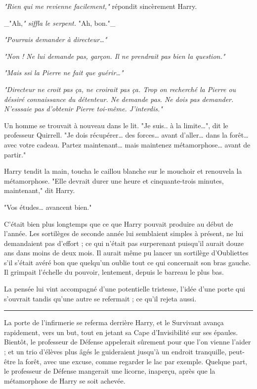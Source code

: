 \emph{"Rien qui me revienne facilement,"}  répondit sincèrement Harry.

\_"Ah,\emph{" siffla le serpent. } "Ah, bon."\_

\emph{"Pourrais demander à directeur…"} 

\emph{"Non ! Ne lui demande pas, garçon. Il ne prendrait pas bien la question."} 

\emph{"Mais ssi la Pierre ne fait que guérir…"} 

\emph{"Directeur ne croit pas ça, ne croirait pas ça. Trop on recherché la Pierre ou déssiré connaissance du détenteur. Ne demande pas. Ne dois pas demander. N'esssaie pas d'obtenir Pierre toi-même. J'interdis."} 

Un homme se trouvait à nouveau dans le lit. "Je suis.. à la limite…", dit le professeur Quirrell. "Je dois récupérer… des forces… avant d'aller… dans la forêt… avec votre cadeau. Partez maintenant… mais maintenez métamorphose… avant de partir."

Harry tendit la main, toucha le caillou blanche sur le mouchoir et renouvela la métamorphose. "Elle devrait durer une heure et cinquante-trois minutes, maintenant," dit Harry.

"Vos études… avancent bien."

C'était bien plus longtemps que ce que Harry pouvait produire au début de l'année. Les sortilèges de seconde année lui semblaient simples à présent, ne lui demandaient pas d'effort ; ce qui n'était pas surperenant puisqu'il aurait douze ans dans moins de deux mois. Il aurait même pu lancer un sortilège d'Oubliettes s'il s'était avéré bon que quelqu'un oublie tout ce qui concernait son bras gauche. Il grimpait l'échelle du pouvoir, lentement, depuis le barreau le plus bas.

La pensée lui vint accompagné d'une potentielle tristesse, l'idée d'une porte qui s'ouvrait tandis qu'une autre se refermait ; ce qu'il rejeta aussi.
\par\noindent\rule{\textwidth}{0.4pt}
La porte de l'infirmerie se referma derrière Harry, et le Survivant avança rapidement, vers un but, tout en jetant sa Cape d'Invisibilité sur ses épaules. Bientôt, le professeur de Défense appelerait sûrement pour que l'on vienne l'aider ; et un trio d'élèves plus âgés le guideraient jusqu'à un endroit tranquille, peut-être la forêt, avec une excuse, comme regarder le lac par exemple. Quelque part, le professeur de Défense mangerait une licorne, inaperçu, après que la métamorphose de Harry se soit achevée.

